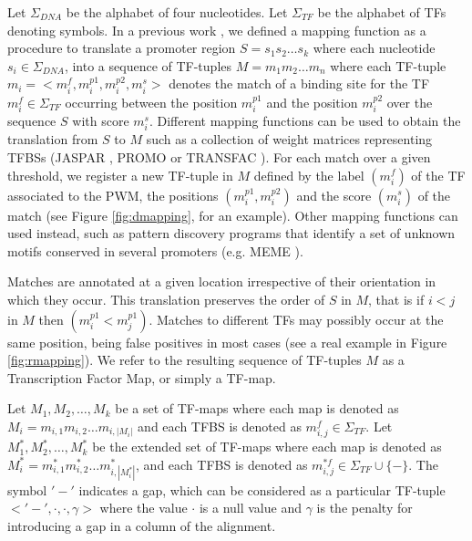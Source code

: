 Let $\Sigma_{DNA}$ be the alphabet of four nucleotides. Let $\Sigma_{TF}$ be 
the alphabet of TFs denoting symbols. In a previous work \citep{blanco:2006b}, 
we defined a mapping function as a procedure to translate a promoter region 
$S = s_1 s_2 \ldots s_k$ where each nucleotide $s_i \in \Sigma_{DNA}$, into a
sequence of TF-tuples $M = m_1 m_2 \ldots m_n$ where each TF-tuple 
$m_i=<m_i^f,m_i^{p1},m_i^{p2},m_i^s>$ denotes the match 
of a binding site for the TF $m_i^f \in \Sigma_{TF}$ occurring between the
position $m_i^{p1}$ and the position $m_i^{p2}$ over the sequence $S$
with score $m_i^s$. Different mapping functions can be used to obtain the 
translation from $S$ to $M$ such as a collection of weight matrices representing TFBSs
(JASPAR \citep{vlieghe:2006a}, PROMO \citep{farre:2003a} or TRANSFAC \citep{matys:2006a}). 
For each match over a given threshold, we register a new TF-tuple in $M$ defined 
by the label $(m_i^f)$ of the TF associated to the PWM, the positions 
$(m_i^{p1},m_i^{p2})$ and the score $(m_i^s)$ of the match (see Figure 
\ref{fig:dmapping}, for an example). Other mapping functions can used instead, such 
as pattern discovery programs that identify a set of unknown motifs conserved 
in several promoters (e.g. MEME \citep{bailey:1994a}).

Matches are annotated at a given location irrespective of their orientation 
in which they occur. This translation preserves the order of $S$ in $M$, that 
is if $i<j$ in $M$ then $(m_i^{p1} < m_j^{p1})$. Matches to different TFs may 
possibly occur at the same position, being false positives in most cases (see 
a real example in Figure \ref{fig:rmapping}). We refer to the resulting sequence 
of TF-tuples $M$ as a Transcription Factor Map, or simply a TF-map.

 
Let $M_1,M_2,\ldots,M_k$ be a set of TF-maps where each map is denoted
as $M_i = m_{i,1} m_{i,2} \ldots m_{i,|M_i|}$ and each TFBS is
denoted as $m_{i,j}^f \in \Sigma_{TF}$. Let $M_1^*,M_2^*,\ldots,M_k^*$
be the extended set of TF-maps where each map is denoted as $M_i^* =
m_{i,1}^* m_{i,2}^* \ldots m_{i,|M_i^*|}^*$, and each TFBS is denoted
as $m_{i,j}^{*f} \in \Sigma_{TF} \cup \{-\}$. The symbol $'-'$ indicates a
gap, which can be considered as a particular TF-tuple 
$<'-',\cdot,\cdot,\gamma>$ where the value $\cdot$ is a null value 
and $\gamma$ is the penalty for introducing a gap in a column of the alignment.

